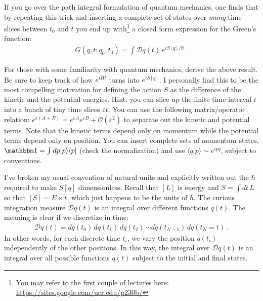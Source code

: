 If you go over the path integral formulation of quantum mechanics, one finds that by repeating this trick and inserting a complete set of states over \emph{many} time slices between $t_0$ and $t$ you end up with\footnote{You may refer to the first couple of lectures here: \url{https://sites.google.com/ucr.edu/p230b/}} a closed form expression for the Green's function:
\begin{align}
	G(q,t;q_0,t_0)  = \int \mathcal Dq(t) \, e^{iS[q]/\hbar} \ .
	\label{eq:G:QM}
\end{align}
\begin{exercise}
For those with some familiarity with quantum mechanics, derive the above result. Be sure to keep track of how $e^{i\hat H t}$ turns into $e^{iS[q]}$. I personally find this to be the most compelling motivation for defining the action $S$ as the difference of the kinetic and the potential energies. Hint: you can slice up the finite time interval $t$ into a bunch of tiny time slices $\varepsilon t$. You can use the following matrix/operator relation: $e^{\varepsilon(A+B)} = e^{\varepsilon A}e^{\varepsilon B}+\mathcal O(\varepsilon^2)$ to separate out the kinetic and potential terms. Note that the kinetic terms depend only on momentum while the potential terms depend only on position. You can insert complete sets of momentum states, $\mathbbm 1 = \int dp |p\rangle \langle p|$ (check the normalization) and use $\langle q|p\rangle \sim e^{ipq}$, subject to conventions.
\end{exercise}
I've broken my usual convention of natural units and explicitly written out the $\hbar$ required to make $S[q]$ dimensionless. Recall that $[L]$ is energy and $S = \int dt \, L$ so that $[S] = E\times t$, which just happens to be the units of $\hbar$. The curious integration measure $\mathcal Dq(t)$ is an integral over different functions $q(t)$. The meaning is clear if we discretize in time:
\begin{align}
	\mathcal D q(t) = dq(t_0)\,dq(t_1)\,dq(t_2)\,\cdots dq(t_{N-1})\,dq(t_N = t) \ .
\end{align}
In other words, for each discrete time $t_i$, we vary the position $q(t_i)$ independently of the other positions. In this way, the integral over $\mathcal D q(t)$ is an integral over all possible functions $q(t)$ subject to the initial and final states.

